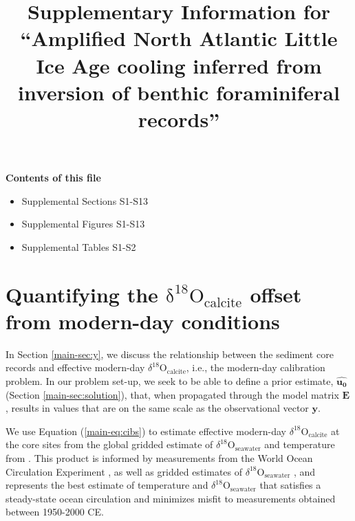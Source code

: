 \documentclass[draft]{agujournal2019}
\begin{document}
\renewcommand{\theequation}{S\arabic{equation}}
\renewcommand{\thefigure}{S\arabic{figure}}
\renewcommand{\thesection}{S\arabic{section}}
\renewcommand{\thetable}{S\arabic{table}}

\title{Supplementary Information for ``Amplified North Atlantic Little Ice Age cooling inferred from inversion of benthic foraminiferal records''}





\begin{center} \textbf{Contents of this file} \end{center}
\begin{itemize}
\item Supplemental Sections S1-S13
\item Supplemental Figures S1-S13
\item Supplemental Tables S1-S2 
\end{itemize}

\section{Quantifying the $\mathrm{\delta^{18}O_{calcite}}$ offset from modern-day conditions \label{sec:offset}}
In Section \ref{main-sec:y}, we discuss the relationship between the sediment core records and effective modern-day $\delta^{18}\mathrm{O}_{\mathrm{calcite}}$, i.e., the modern-day calibration problem. In our problem set-up, we seek to be able to define a prior estimate, $\mathbf{\hat{u_{0}}}$ (Section \ref{main-sec:solution}), that, when propagated through the model matrix $\mathbf{E}$, results in values that are on the same scale as the observational vector $\mathbf{y}$. 

 We use Equation (\ref{main-eq:cibs}) to estimate effective modern-day $\delta^{18}\mathrm{O}_{\mathrm{calcite}}$ at the core sites from the global gridded estimate of $\delta^{18}\mathrm{O}_{\mathrm{seawater}}$ and temperature from . This product is informed by measurements from the World Ocean Circulation Experiment \cite{Gouretski-Koltermann-2004:WOCE}, as well as gridded estimates of $\delta^{18}\mathrm{O}_{\mathrm{seawater}}$ \cite{LeGrande-Schmidt-2006:Global}, and represents the best estimate of temperature and $\delta^{18}\mathrm{O}_{\mathrm{seawater}}$ that satisfies a steady-state ocean circulation and minimizes misfit to measurements obtained between 1950-2000 CE.
\end{document}
